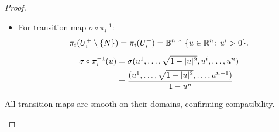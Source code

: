 \begin{problem}
\begin{proof}
\begin{enumerate}
\begin{itemize}
\begin{itemize}
          \item For transition map $\sigma \circ \pi_i^{-1} \colon$
          \begin{gather*}
            \pi_i(U_i^+\setminus \{N\}) = \pi_i(U_i^+) = \mathbb{B}^n \cap \{u \in \mathbb{R}^n \colon u^i >0\}. \\[0.5em]
            \begin{aligned}
                \sigma \circ \pi_i^{-1}(u) &= \sigma(u^1, \dots, \sqrt{1-|u|^2}, u^i, \dots, u^n) \\
                &= \dfrac{(u^1, \dots, \sqrt{1-|u|^2}, \dots, u^{n-1})}{1-u^n}
            \end{aligned}
        \end{gather*}
        \end{itemize}
      \end{itemize}
      All transition maps are smooth on their domains, confirming compatibility.
    \end{enumerate}
  \end{proof}
\end{problem}

